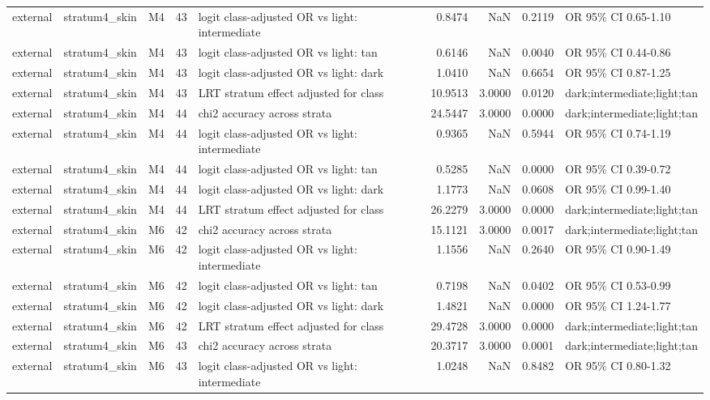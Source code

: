 \begin{tabular}{lllrlrrrl}
external & stratum4\_skin & M4 & 43 & logit class-adjusted OR vs light: intermediate & 0.8474 & NaN & 0.2119 & OR 95\% CI 0.65-1.10 \\
external & stratum4\_skin & M4 & 43 & logit class-adjusted OR vs light: tan & 0.6146 & NaN & 0.0040 & OR 95\% CI 0.44-0.86 \\
external & stratum4\_skin & M4 & 43 & logit class-adjusted OR vs light: dark & 1.0410 & NaN & 0.6654 & OR 95\% CI 0.87-1.25 \\
external & stratum4\_skin & M4 & 43 & LRT stratum effect adjusted for class & 10.9513 & 3.0000 & 0.0120 & dark;intermediate;light;tan \\
external & stratum4\_skin & M4 & 44 & chi2 accuracy across strata & 24.5447 & 3.0000 & 0.0000 & dark;intermediate;light;tan \\
external & stratum4\_skin & M4 & 44 & logit class-adjusted OR vs light: intermediate & 0.9365 & NaN & 0.5944 & OR 95\% CI 0.74-1.19 \\
external & stratum4\_skin & M4 & 44 & logit class-adjusted OR vs light: tan & 0.5285 & NaN & 0.0000 & OR 95\% CI 0.39-0.72 \\
external & stratum4\_skin & M4 & 44 & logit class-adjusted OR vs light: dark & 1.1773 & NaN & 0.0608 & OR 95\% CI 0.99-1.40 \\
external & stratum4\_skin & M4 & 44 & LRT stratum effect adjusted for class & 26.2279 & 3.0000 & 0.0000 & dark;intermediate;light;tan \\
external & stratum4\_skin & M6 & 42 & chi2 accuracy across strata & 15.1121 & 3.0000 & 0.0017 & dark;intermediate;light;tan \\
external & stratum4\_skin & M6 & 42 & logit class-adjusted OR vs light: intermediate & 1.1556 & NaN & 0.2640 & OR 95\% CI 0.90-1.49 \\
external & stratum4\_skin & M6 & 42 & logit class-adjusted OR vs light: tan & 0.7198 & NaN & 0.0402 & OR 95\% CI 0.53-0.99 \\
external & stratum4\_skin & M6 & 42 & logit class-adjusted OR vs light: dark & 1.4821 & NaN & 0.0000 & OR 95\% CI 1.24-1.77 \\
external & stratum4\_skin & M6 & 42 & LRT stratum effect adjusted for class & 29.4728 & 3.0000 & 0.0000 & dark;intermediate;light;tan \\
external & stratum4\_skin & M6 & 43 & chi2 accuracy across strata & 20.3717 & 3.0000 & 0.0001 & dark;intermediate;light;tan \\
external & stratum4\_skin & M6 & 43 & logit class-adjusted OR vs light: intermediate & 1.0248 & NaN & 0.8482 & OR 95\% CI 0.80-1.32 \\

\end{tabular}
